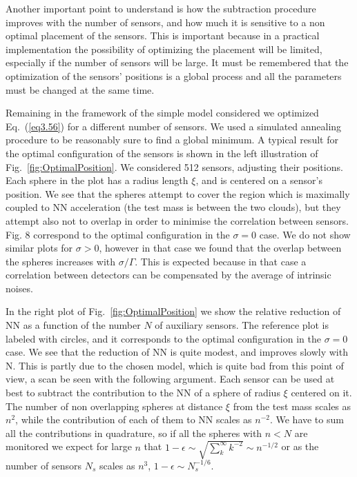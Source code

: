 Another important point to understand is how the subtraction procedure improves with the number of sensors, and how much it is sensitive to a non optimal placement of the sensors. This is important because in a practical implementation the possibility of optimizing the placement will be limited, especially if the number of sensors will be large. It must be remembered that the optimization of the sensors' positions is a global process and all the parameters must be changed at the same time. 

Remaining in the framework of the simple model considered we optimized Eq.~(\ref{eq3.56}) for a different number of sensors. We used a simulated annealing procedure to be reasonably sure to find a global minimum. A typical result for the optimal configuration of the sensors is shown in the left illustration of Fig.~\ref{fig:OptimalPosition}. We considered 512 sensors, adjusting their positions. Each sphere in the plot has a radius length $\xi$, and is centered on a sensor's position. We see that the spheres attempt to cover the region which is maximally coupled to NN acceleration (the test mass is between the two clouds), but they attempt also not to overlap in order to minimise the correlation between sensors. Fig. 8 correspond to the optimal configuration in the $\sigma= 0$ case. We do not show similar plots for $\sigma > 0$, however in that case we found that the overlap between the spheres increases with $\sigma/\Gamma$. This is expected because in that case a correlation between detectors can be compensated by the average of intrinsic noises. 

In the right plot of Fig.~\ref{fig:OptimalPosition} we show the relative reduction of NN as a function of the number $N$ of auxiliary sensors. The reference plot is labeled with circles, and it corresponds to the optimal configuration in the $\sigma= 0$ case. We see that the reduction of NN is quite modest, and improves slowly with N. This is partly due to the chosen model, which is quite bad from this point of view, a scan be seen with the following argument. Each sensor can be used at best to subtract the contribution to the NN of a sphere of radius $\xi$ centered on it. The number of non overlapping spheres at distance $\xi$ from the test mass scales as $n^2$, while the contribution of each of them to NN scales as $n^{-2}$. We have to sum all the contributions in quadrature, so if all the spheres with $n<N$ are monitored we expect for large $n$ that $1-\epsilon\sim\sqrt{\sum^{\infty}_{k}k^{-2}}\sim n^{-1/2}$ or as the number of sensors $N_{s}$ scales as $n^{3}$, $1-\epsilon\sim N^{-1/6}_{s}$. 

